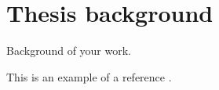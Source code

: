 \chapter{Thesis background}
\label{sect::background}

Background of your work.

This is an example of a reference \parencite{Croff1983}.